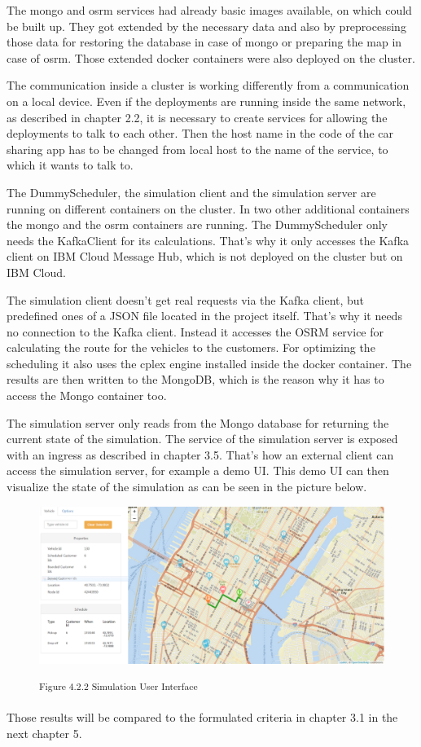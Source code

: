 The mongo and osrm services had already basic images available, on which could be built up. They got extended by the necessary data and also by preprocessing those data for restoring the database in case of mongo or preparing the map in case of osrm. Those extended docker containers were also deployed on the cluster.

The communication inside a cluster is working differently from a communication on a local device. Even if the deployments are running inside the same network, as described in chapter 2.2, it is necessary to create services for allowing the deployments to talk to each other. Then the host name in the code of the car sharing app has to be changed from local host to the name of the service, to which it wants to talk to.


The DummyScheduler, the simulation client and the simulation server are running on different containers on the cluster. In two other additional containers the mongo and the osrm containers are running. The DummyScheduler only needs the KafkaClient for its calculations. That's why it only accesses the Kafka client on IBM Cloud Message Hub, which is not deployed on the cluster but on IBM Cloud.

The simulation client doesn't get real requests via the Kafka client, but predefined ones of a JSON file located in the project itself. That's why it needs no connection to the Kafka client. Instead it accesses the OSRM service for calculating the route for the vehicles to the customers. For optimizing the scheduling it also uses the cplex engine installed inside the docker container. The results are then written to the MongoDB, which is the reason why it has to access the Mongo container too. 

The simulation server only reads from the Mongo database for returning the current state of the simulation. The service of the simulation server is exposed with an ingress as described in chapter 3.5. That's how an external client can access the simulation server, for example a demo UI. This demo UI can then visualize the state of the simulation as can be seen in the picture below.

\begin{figure}[h]
\centering
\includegraphics[width=\textwidth/5*4]{images/simulation_ui.png}

\textsuperscript{Figure 4.2.2 Simulation User Interface}\\
\end{figure}

Those results will be compared to the formulated criteria in chapter 3.1 in the next chapter 5.